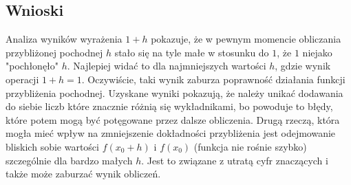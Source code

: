 \documentclass[11pt,a4paper]{article}
\begin{document}
\subsection{Wnioski}
Analiza wyników wyrażenia $1+h$ pokazuje, że w pewnym momencie obliczania przybliżonej pochodnej $h$ stało się na tyle małe w stosunku do $1$, że $1$ niejako "pochłonęło" $h$. Najlepiej widać to dla najmniejszych wartości $h$, gdzie wynik operacji $1+h=1$. Oczywiście, taki wynik zaburza poprawność działania funkcji przybliżenia pochodnej. Uzyskane wyniki pokazują, że należy unikać dodawania do siebie liczb które znacznie różnią się wykładnikami, bo powoduje to błędy, które potem mogą być potęgowane przez dalsze obliczenia. Drugą rzeczą, która mogła mieć wpływ na zmniejszenie dokładności przybliżenia jest odejmowanie bliskich sobie wartości $f(x_0 + h)$ i $f(x_0)$ (funkcja nie rośnie szybko) szczególnie dla bardzo małych $h$. Jest to związane z utratą cyfr znaczących i także może zaburzać wynik obliczeń. 
\end{document}
